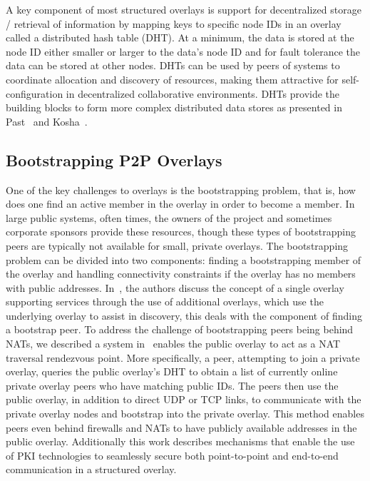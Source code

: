 \documentclass[conference]{IEEEtran}
\begin{document}
A key component of most structured overlays is support for decentralized
storage / retrieval of information by mapping keys to specific node IDs in an
overlay called a distributed hash table (DHT).  At a minimum, the data is
stored at the node ID either smaller or larger to the data's node ID and for
fault tolerance the data can be stored at other nodes.  DHTs can be used by
peers of systems to coordinate allocation and discovery of resources, making
them attractive for self-configuration in decentralized collaborative
environments.  DHTs provide the building blocks to form more complex
distributed data stores as presented in Past~\cite{past} and
Kosha~\cite{kosha}.

\subsection{Bootstrapping P2P Overlays}

One of the key challenges to overlays is the bootstrapping problem, that is,
how does one find an active member in the overlay in order to become a member.
In large public systems, often times, the owners of the project and sometimes
corporate sponsors provide these resources, though these types of bootstrapping
peers are typically not available for small, private overlays.  The
bootstrapping problem can be divided into two components: finding a
bootstrapping member of the overlay and handling connectivity constraints if
the overlay has no members with public addresses.  In~\cite{one_ring,
can_multicast}, the authors discuss the concept of a single overlay supporting
services through the use of additional overlays, which use the underlying
overlay to assist in discovery, this deals with the component of finding a
bootstrap peer.  To address the challenge of bootstrapping peers being behind
NATs, we described a system in~\cite{vpo} enables the public overlay to act as
a NAT traversal rendezvous point.  More specifically, a peer, attempting to
join a private overlay, queries the public overlay's DHT to obtain a list of
currently online private overlay peers who have matching public IDs.  The peers
then use the public overlay, in addition to direct UDP or TCP links, to
communicate with the private overlay nodes and bootstrap into the private
overlay.  This method enables peers even behind firewalls and NATs to have
publicly available addresses in the public overlay.  Additionally this work
describes mechanisms that enable the use of PKI technologies to seamlessly
secure both point-to-point and end-to-end communication in a structured
overlay.
\end{document}
